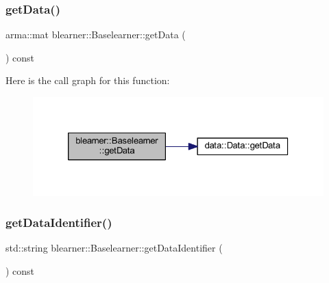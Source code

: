 \subsubsection{\texorpdfstring{get\+Data()}{getData()}}
{\footnotesize\ttfamily arma\+::mat blearner\+::\+Baselearner\+::get\+Data (\begin{DoxyParamCaption}{ }\end{DoxyParamCaption}) const}

Here is the call graph for this function\+:\nopagebreak
\begin{figure}[H]
\begin{center}
\leavevmode
\includegraphics[width=326pt]{classblearner_1_1_baselearner_af3a360bb039447610e9928956384c05d_cgraph}
\end{center}
\end{figure}
\mbox{\label{classblearner_1_1_baselearner_a2393dc1e3cf90919ebbbd237fe303860}} 
\subsubsection{\texorpdfstring{get\+Data\+Identifier()}{getDataIdentifier()}}
{\footnotesize\ttfamily std\+::string blearner\+::\+Baselearner\+::get\+Data\+Identifier (\begin{DoxyParamCaption}{ }\end{DoxyParamCaption}) const}

